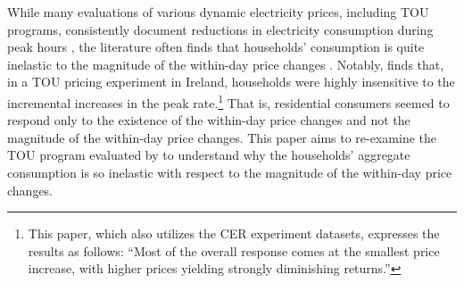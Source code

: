 While many evaluations of various dynamic electricity prices, including TOU programs, consistently document reductions in electricity consumption during peak hours \citep{Quantifying-Customer-Response-to-Dynamic-Pricing_Faruqui-and-George_2005, Dynamic-Pricing-of-Electricity-in-the-Mid-Atlantic-Region_Econometric-Results-from-the-Baltimore-Gas-and-Electric-Company-Experiment_Faruqui-et-al_2011, Dynamic-Pricing-of-Electricity-for-Residential-Customers_The-Evidence-from-Michigan_Faruqui-et-al_2013}, the literature often finds that households' consumption is quite inelastic to the magnitude of the within-day price changes \citep{Rethinking-Real-Time-Electricity-Pricing_Allcott_2011, Knowledge-is-Less-Power_Jessoe-and-Rapson_2014}. Notably, \cite{Peaking-Interest:How-Awareness-Drives-the-Effectiveness-of-Time-of-Use-Electricity-Pricing_Prest_2020} finds that, in a TOU pricing experiment in Ireland, households were highly insensitive to the incremental increases in the peak rate.\footnote{This paper, which also utilizes the CER experiment datasets, expresses the results as follows: ``Most of the overall response comes at the smallest price increase, with higher prices yielding strongly diminishing returns.''} That is, residential consumers seemed to respond only to the existence of the within-day price changes and not the magnitude of the within-day price changes. This paper aims to re-examine the TOU program evaluated by \cite{Peaking-Interest:How-Awareness-Drives-the-Effectiveness-of-Time-of-Use-Electricity-Pricing_Prest_2020} to understand why the households' aggregate consumption is so inelastic with respect to the magnitude of the within-day price changes. 

